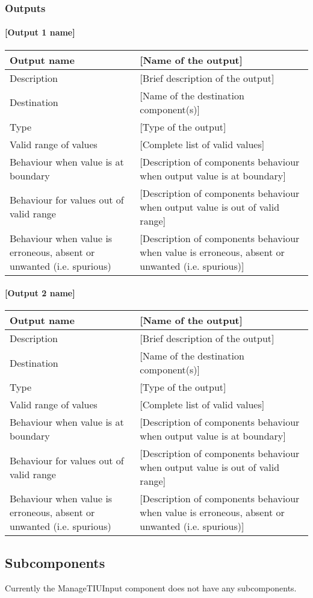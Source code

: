 \subsubsection{Outputs}\label{s:manageTIUInput_outputs}

\paragraph{[Output 1 name]}

\begin{longtable}{p{}p{}}
\toprule
Output name				& [Name of the output] \\
\midrule
Description				& [Brief description of the output] \\
\midrule
Destination				& [Name of the destination component(s)] \\ 
\midrule
Type					& [Type of the output] \\
\midrule
Valid range of values	& [Complete list of valid values] \\
\midrule
Behaviour when value is at boundary	& [Description of components behaviour when output value is at boundary] \\
\midrule
Behaviour for values out of valid range	& [Description of components behaviour when output value is out of valid range] \\
\midrule
Behaviour when value is erroneous, absent or unwanted (i.e. spurious) & [Description of components behaviour when value is erroneous, absent or unwanted (i.e. spurious)] \\
\bottomrule
\end{longtable}


\paragraph{[Output 2 name]}

\begin{longtable}{p{}p{}}
\toprule
Output name				& [Name of the output] \\
\midrule
Description				& [Brief description of the output] \\
\midrule
Destination				& [Name of the destination component(s)] \\ 
\midrule
Type					& [Type of the output] \\
\midrule
Valid range of values	& [Complete list of valid values] \\
\midrule
Behaviour when value is at boundary	& [Description of components behaviour when output value is at boundary] \\
\midrule
Behaviour for values out of valid range	& [Description of components behaviour when output value is out of valid range] \\
\midrule
Behaviour when value is erroneous, absent or unwanted (i.e. spurious) & [Description of components behaviour when value is erroneous, absent or unwanted (i.e. spurious)] \\
\bottomrule
\end{longtable}

\subsection{Subcomponents}\label{s:manageTIUInput_subcomponents}

Currently the ManageTIUInput component does not have any subcomponents.
